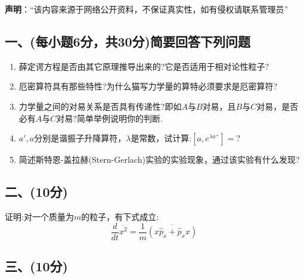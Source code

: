 
\textbf{声明}：“该内容来源于网络公开资料，不保证真实性，如有侵权请联系管理员”

\subsection{一、(每小题6分，共30分)简要回答下列问题}
\begin{enumerate}
\item 薛定谔方程是否由其它原理推导出来的?它是否适用于相对论性粒子?
\item 厄密算符具有那些特性?为什么猫写力学量的算特必须要求是厄密算符?
\item 力学量之间的对易关系是否具有传递性?即如$A$与$B$对易，且$B$与$C$对易，是否必有$A$与$C$对易?简单举例说明你的判断.
\item $a',a$分别是谐振子升降算符，$\lambda$是常数，试计算:$\left[ a,e^{\lambda a^+} \right]=?$
\item 简述斯特恩-盖拉赫(Stern-Gerlach)实验的实验现象，通过该实验有什么发现?
\end{enumerate}
\subsection{二、(10分)}
证明:对一个质量为$m$的粒子，有下式成立:
$$\frac{d}{dt} \overline{x^2} = \frac{1}{m} \overline{\left( {x} \hat{p}_x + \hat{p}_x {x}\right)}~$$
\subsection{三、(10分)}